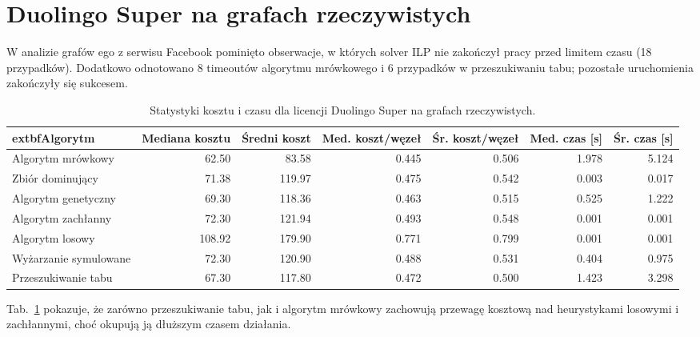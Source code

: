 \section{Duolingo Super na grafach rzeczywistych}

W analizie grafów ego z serwisu Facebook pominięto obserwacje, w których solver ILP nie zakończył pracy przed limitem czasu (18 przypadków). Dodatkowo odnotowano 8 timeoutów algorytmu mrówkowego i 6 przypadków w przeszukiwaniu tabu; pozostałe uruchomienia zakończyły się sukcesem.

\begin{table}[H]
  \centering
  \caption{Statystyki kosztu i czasu dla licencji Duolingo Super na grafach rzeczywistych.}
  \label{tab:duo-real-alg}
  \begin{tabular}{lrrrrrr}
    \toprule
    extbf{Algorytm}       & \textbf{Mediana kosztu} & \textbf{Średni koszt} & \textbf{Med. koszt/węzeł} & \textbf{Śr. koszt/węzeł} & \textbf{Med. czas [s]} & \textbf{Śr. czas [s]} \\
    \midrule
    Algorytm mrówkowy     & 62.50                   & 83.58                 & 0.445                     & 0.506                    & 1.978                  & 5.124                 \\
    Zbiór dominujący      & 71.38                   & 119.97                & 0.475                     & 0.542                    & 0.003                  & 0.017                 \\
    Algorytm genetyczny   & 69.30                   & 118.36                & 0.463                     & 0.515                    & 0.525                  & 1.222                 \\
    Algorytm zachłanny    & 72.30                   & 121.94                & 0.493                     & 0.548                    & 0.001                  & 0.001                 \\
    Algorytm losowy       & 108.92                  & 179.90                & 0.771                     & 0.799                    & 0.001                  & 0.001                 \\
    Wyżarzanie symulowane & 72.30                   & 120.90                & 0.488                     & 0.531                    & 0.404                  & 0.975                 \\
    Przeszukiwanie tabu   & 67.30                   & 117.80                & 0.472                     & 0.500                    & 1.423                  & 3.298                 \\
    \bottomrule
  \end{tabular}
\end{table}
Tab.~\ref{tab:duo-real-alg} pokazuje, że zarówno przeszukiwanie tabu, jak i algorytm mrówkowy zachowują przewagę kosztową nad heurystykami losowymi i zachłannymi, choć okupują ją dłuższym czasem działania.

